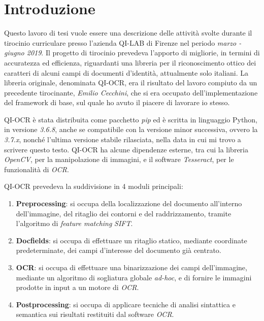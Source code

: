 \chapter*{Introduzione}

Questo lavoro di tesi vuole essere una descrizione delle attivit\`a svolte durante il tirocinio curriculare presso l'azienda QI-LAB di Firenze nel periodo \textit{marzo - giugno 2019}. Il progetto di tirocinio prevedeva l'apporto di migliorie, in termini di accuratezza ed efficienza, riguardanti una libreria per il riconoscimento ottico dei caratteri di alcuni campi di documenti d'identit\`a, attualmente solo italiani. La libreria originale, denominata QI-OCR, era il risultato del lavoro compiuto da un precedente tirocinante, \textit{Emilio Cecchini}, che si era occupato dell'implementazione del framework di base, sul quale ho avuto il piacere di lavorare io stesso.\par
QI-OCR \`e stata distribuita come pacchetto \textit{pip} ed \`e scritta in linguaggio Python, in versione \textit{3.6.8}, anche se compatibile con la versione minor successiva, ovvero la \textit{3.7.x}, nonch\'e l'ultima versione stabile rilasciata, nella data in cui mi trovo a scrivere questo testo. QI-OCR ha alcune dipendenze esterne, tra cui la libreria \textit{OpenCV}, per la manipolazione di immagini, e il software \textit{Tesseract}, per le funzionalit\`a di \textit{OCR}.\par
QI-OCR prevedeva la suddivisione in 4 moduli principali:
\begin{enumerate}
	\item \textbf{Preprocessing}: si occupa della localizzazione del documento all'interno dell'immagine, del ritaglio dei contorni e del raddrizzamento, tramite l'algoritmo di \textit{feature matching} \textit{SIFT}.
	\item \textbf{Docfields}: si occupa di effettuare un ritaglio statico, mediante coordinate predeterminate, dei campi d'interesse del documento gi\`a centrato.
	\item \textbf{OCR}: si occupa di effettuare una binarizzazione dei campi dell'immagine, mediante un algoritmo di sogliatura globale \textit{ad-hoc}, e di fornire le immagini prodotte in input a un motore di \textit{OCR}.
	\item \textbf{Postprocessing}: si occupa di applicare tecniche di analisi sintattica e semantica sui risultati restituiti dal software \textit{OCR}.
\end{enumerate}\par
